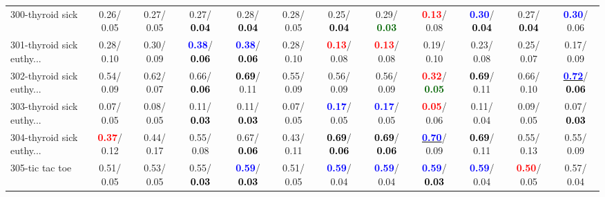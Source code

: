 \begin{table}[h]
\begin{center}
{\begin{tabular}{lc|c|c|c|c|c|c|c|c|c|c}
300-thyroid sick &   0.26/  0.05 &   0.27/  0.05 &   0.27/\textcolor{black}{\textbf{  0.04}} &   0.28/\textcolor{black}{\textbf{  0.04}} &   0.28/  0.05 &   0.25/\textcolor{black}{\textbf{  0.04}} &   0.29/\textcolor{darkgreen}{\textbf{  0.03}} & \textcolor{red}{\textbf{  0.13}}/  0.08 & \textcolor{blue}{\textbf{  0.30}}/\textcolor{black}{\textbf{  0.04}} &   0.27/\textcolor{black}{\textbf{  0.04}} & \textcolor{blue}{\textbf{  0.30}}/  0.06 \\
301-thyroid sick euthy... &   0.28/  0.10 &   0.30/  0.09 & \textcolor{blue}{\textbf{  0.38}}/\textcolor{black}{\textbf{  0.06}} & \textcolor{blue}{\textbf{  0.38}}/\textcolor{black}{\textbf{  0.06}} &   0.28/  0.10 & \textcolor{red}{\textbf{  0.13}}/  0.08 & \textcolor{red}{\textbf{  0.13}}/  0.08 &   0.19/  0.10 &   0.23/  0.08 &   0.25/  0.07 &   0.17/  0.09 \\
302-thyroid sick euthy... &   0.54/  0.09 &   0.62/  0.07 &   0.66/\textcolor{black}{\textbf{  0.06}} & \textcolor{black}{\textbf{  0.69}}/  0.11 &   0.55/  0.09 &   0.56/  0.09 &   0.56/  0.09 & \textcolor{red}{\textbf{  0.32}}/\textcolor{darkgreen}{\textbf{  0.05}} & \textcolor{black}{\textbf{  0.69}}/  0.11 &   0.66/  0.10 & \underline{\textcolor{blue}{\textbf{  0.72}}}/\textcolor{black}{\textbf{  0.06}} \\ \hline
303-thyroid sick euthy... &   0.07/  0.05 &   0.08/  0.05 &   0.11/\textcolor{black}{\textbf{  0.03}} &   0.11/\textcolor{black}{\textbf{  0.03}} &   0.07/  0.05 & \textcolor{blue}{\textbf{  0.17}}/  0.05 & \textcolor{blue}{\textbf{  0.17}}/  0.05 & \textcolor{red}{\textbf{  0.05}}/  0.06 &   0.11/  0.04 &   0.09/  0.05 &   0.07/\textcolor{black}{\textbf{  0.03}} \\
304-thyroid sick euthy... & \textcolor{red}{\textbf{  0.37}}/  0.12 &   0.44/  0.17 &   0.55/  0.08 &   0.67/\textcolor{black}{\textbf{  0.06}} &   0.43/  0.11 & \textcolor{black}{\textbf{  0.69}}/\textcolor{black}{\textbf{  0.06}} & \textcolor{black}{\textbf{  0.69}}/\textcolor{black}{\textbf{  0.06}} & \underline{\textcolor{blue}{\textbf{  0.70}}}/  0.09 & \textcolor{black}{\textbf{  0.69}}/  0.11 &   0.55/  0.13 &   0.55/  0.09 \\
305-tic tac toe &   0.51/  0.05 &   0.53/  0.05 &   0.55/\textcolor{black}{\textbf{  0.03}} & \textcolor{blue}{\textbf{  0.59}}/\textcolor{black}{\textbf{  0.03}} &   0.51/  0.05 & \textcolor{blue}{\textbf{  0.59}}/  0.04 & \textcolor{blue}{\textbf{  0.59}}/  0.04 & \textcolor{blue}{\textbf{  0.59}}/\textcolor{black}{\textbf{  0.03}} & \textcolor{blue}{\textbf{  0.59}}/  0.04 & \textcolor{red}{\textbf{  0.50}}/  0.05 &   0.57/  0.04 \\

\end{tabular}}
\end{center}
\end{table}
